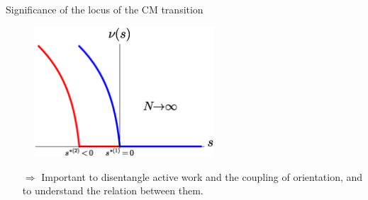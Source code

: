 \documentclass{beamer}
\begin{document}
\begin{frame}{Significance of the locus of the CM transition}

%

\begin{figure}
\centering
\includegraphics[width=0.6\textwidth]{nus.eps}
\end{figure}

\begin{itemize}
  \item[$\Rightarrow$] Important to disentangle active work and the coupling of orientation, and to understand the relation between them.
\end{itemize}

\end{frame}
\end{document}
